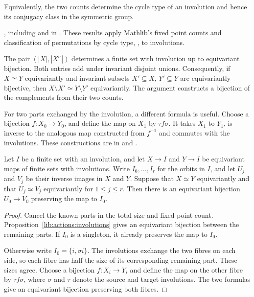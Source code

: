 Equivalently, the two counts determine the cycle type of an involution
and hence its conjugacy class in the symmetric group.
\begin{implementation}
, including
 and
 in
.
These results apply Mathlib's fixed point counts and classification
of permutations by cycle type,
, to involutions.
\end{implementation}

The pair $(|X|,|X^\sigma|)$ determines a finite set with involution up
to equivariant bijection. Both entries add under invariant disjoint
unions. Consequently, if $X\simeq Y$ equivariantly and invariant subsets
$X'\subseteq X$, $Y'\subseteq Y$ are equivariantly bijective, then
$X\setminus X'\simeq Y\setminus Y'$ equivariantly. The argument
constructs a bijection of the complements from their two counts.

For two parts exchanged by the involution, a different formula is useful.
Choose a bijection $f:X_0\to Y_0$, and define the map on $X_1$ by
$\tau f\sigma$. It takes $X_1$ to $Y_1$, is inverse to the analogous
map constructed from $f^{-1}$ and commutes with the involutions.
These constructions are in 
and .

\begin{proposition}
\label{lib:actions:block-cancellation}
Let $I$ be a finite set with an involution, and let $X\to I$ and
$Y\to I$ be equivariant maps of finite sets with involutions.
Write $I_0,\ldots,I_r$ for the orbits in $I$, and let $U_j$ and
$V_j$ be their inverse images in $X$ and $Y$. Suppose that
$X\simeq Y$ equivariantly and that $U_j\simeq V_j$ equivariantly
for $1\leq j\leq r$. Then there is an equivariant bijection
$U_0\to V_0$ preserving the map to $I_0$.
\end{proposition}
\begin{proof}
Cancel the known parts in the total size and fixed point count.
Proposition~\ref{lib:actions:involutions} gives an equivariant
bijection between the remaining parts. If $I_0$ is a singleton,
it already preserves the map to $I_0$.

Otherwise write $I_0=\{i,\sigma i\}$. The involutions exchange
the two fibres on each side, so each fibre has half the size of
its corresponding remaining part. These sizes agree. Choose a
bijection $f:X_i\to Y_i$ and define the map on the other fibre by
$\tau f\sigma$, where $\sigma$ and $\tau$ denote the source and
target involutions. The two formulas give an equivariant bijection
preserving both fibres.
\end{proof}

